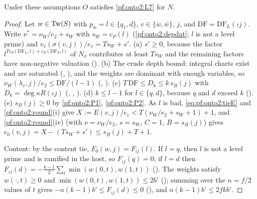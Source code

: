 \begin{proposition}\label{pf:onto2:dram}
Under these assumptions $O$ satisfies \ref{pf:onto2:L7} for $N$.
\end{proposition}

\begin{proof}
Let $w\in\mathrm{Tw}(S)$ with $p_w=l\in\{q_1,d\}$, $v\in\{w,\bar w\}$, $j$, and $\mathrm{DF}=\mathrm{DF}_L(\iota j)$. Write $\nu^*=\nu_W/e_2+s_W$
with $s_W=c_P(l)$ (\cref{pf:onto2:depdat}; $l$ is not a level prime) and $v_v(\sigma(v,j))/e_v=Ts_W+s'$. (a) $s'\ge0$, because the
factor $l^{Tc_P(\mathrm{DF}_L,l)+c_P(\mathrm{DF}_F,l)}$ of $N_\sigma$ contributes at least $Ts_W$ and the remaining factors have
non-negative valuation (). (b) The crude depth bound: integral charts exist and
are saturated (, ),
and the weights are dominant with enough variables, so $\nu_W(\lambda_v,j)/e_2\le\mathrm{DF}/(l-1)$
(, ). (c) $T\,\mathrm{DF}\le D_k\le k\,s_B(j)$
with $D_k=\deg\kappa R(\iota j)$ (, ,
). (d) $k\le l-1$ for $l\in\{q,d\}$, because $q$ and $d$ exceed $k$
(). (e) $s_B(j)\ge0$ by \ref{pf:onto2:P1}, \ref{pf:onto2:P2}. As $l$ is bad,
\eqref{eq:pf:onto2:tieE} and \cref{pf:onto2:round}(i) give $X:=E(v,j)/e_v<T(\nu_W/e_2+s_W+1)+1$, and \cref{pf:onto2:round}(iv) (with
$\nu=\nu_W/e_2$, $s=s_W$, $C=1$, $B=s_B(j)$) gives $e_0(v,j)=X-(Ts_W+s')\le s_B(j)+T+1$.

Content: by the content tie, $F_0(w,j)=F_{\iota j}(l)$. If $l=q$, then $l$ is not a level prime and is ramified in the host, so
$F_{\iota j}(q)=0$; if $l=d$ then $F_{\iota j}(d)=-\frac{k-1}2\sum_t\min(w(0,t),w(1,t))$
(). The weights satisfy $w(\cdot,t)\ge0$ and
$\min(w(0,t),w(1,t))\le2b'$ (); summing over the $n=f/2$ values of $t$ gives
$-n(k-1)b'\le F_{\iota j}(d)\le0$ (), and
$n(k-1)b'\le2fkb'$.
\end{proof}

